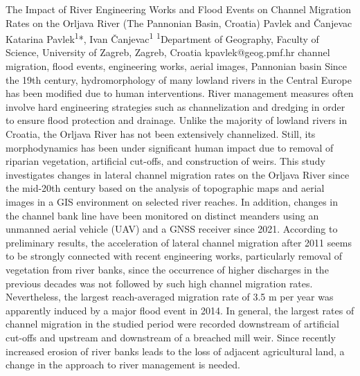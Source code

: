 \abstract
{The Impact of River Engineering Works and Flood Events on Channel Migration Rates on the Orljava River (The Pannonian Basin, Croatia)} 
{Pavlek and Čanjevac} 
{Katarina Pavlek\textsuperscript{1}*, Ivan Čanjevac\textsuperscript{1}} 
{\TLtag} 
{
\textsuperscript{1}Department of Geography, Faculty of Science, University of Zagreb, Zagreb, Croatia
}
{kpavlek@geog.pmf.hr}  %
{channel migration, flood events, engineering works, aerial images, Pannonian basin}
{Since the 19th century, hydromorphology of many lowland rivers in the Central Europe has been modified due to human interventions. River management measures often involve hard engineering strategies such as channelization and dredging in order to ensure flood protection and drainage. Unlike the majority of lowland rivers in Croatia, the Orljava River has not been extensively channelized. Still, its morphodynamics has been under significant human impact due to removal of riparian vegetation, artificial cut-offs, and construction of weirs. This study investigates changes in lateral channel migration rates on the Orljava River since the mid-20th century based on the analysis of topographic maps and aerial images in a GIS environment on selected river reaches. In addition, changes in the channel bank line have been monitored on distinct meanders using an unmanned aerial vehicle (UAV) and a GNSS receiver since 2021. According to preliminary results, the acceleration of lateral channel migration after 2011 seems to be strongly connected with recent engineering works, particularly removal of vegetation from river banks, since the occurrence of higher discharges in the previous decades was not followed by such high channel migration rates. Nevertheless, the largest reach-averaged migration rate of 3.5 m per year was apparently induced by a major flood event in 2014. In general, the largest rates of channel migration in the studied period were recorded downstream of artificial cut-offs and upstream and downstream of a breached mill weir. Since recently increased erosion of river banks leads to the loss of adjacent agricultural land, a change in the approach to river management is needed.
}
{
}

